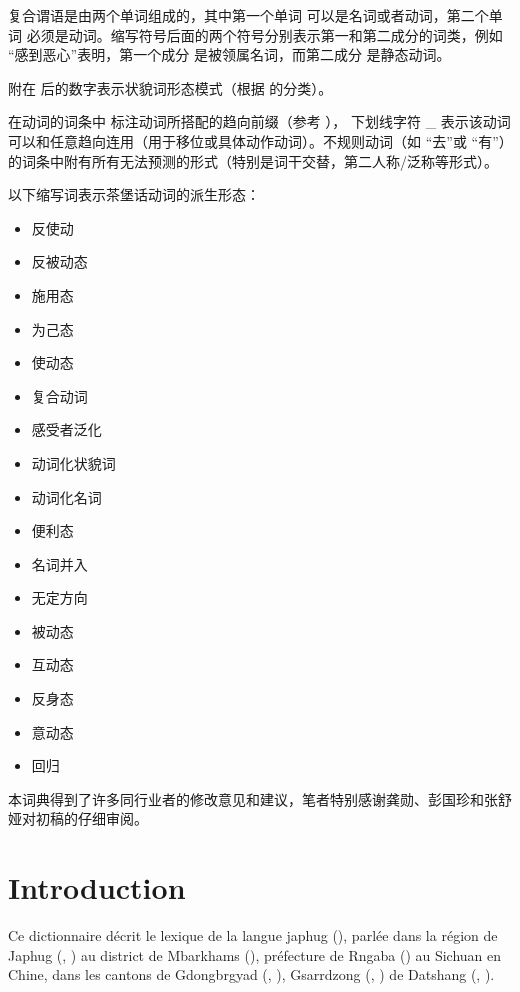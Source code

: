 复合谓语是由两个单词组成的，其中第一个单词  可以是名词或者动词，第二个单词 必须是动词。缩写符号后面的两个符号分别表示第一和第二成分的词类，例如   “感到恶心”表明，第一个成分  是被领属名词，而第二成分 是静态动词。

附在  后的数字表示状貌词形态模式（根据 \citealt{japhug14ideophones}的分类）。

在动词的词条中  标注动词所搭配的趋向前缀（参考 \citealt[267-9]{jacques14linking}）， 下划线字符 \_ 表示该动词可以和任意趋向连用（用于移位或具体动作动词）。不规则动词（如  “去”或    “有”）的词条中附有所有无法预测的形式（特别是词干交替，第二人称/泛称等形式）。

 以下缩写词表示茶堡话动词的派生形态：

\begin{itemize}
\item {} 反使动 
\item {} 反被动态
\item {} 施用态
\item {} 为己态
\item {} 使动态
\item {} 复合动词
\item {} 感受者泛化
\item {} 动词化状貌词
\item {} 动词化名词
\item {} 便利态
\item {} 名词并入
\item {} 无定方向
\item {} 被动态
\item {} 互动态
\item {} 反身态
\item {} 意动态
\item {} 回归
\end{itemize}

本词典得到了许多同行业者的修改意见和建议，笔者特别感谢龚勋、彭国珍和张舒娅对初稿的仔细审阅。
\newpage
\normalfont
\section*{Introduction}

Ce  dictionnaire décrit le lexique de la langue japhug (), parlée dans la région de Japhug (, ) au district de Mbarkhams (), préfecture de Rngaba () au Sichuan en Chine, dans les cantons de Gdongbrgyad (, ), Gsarrdzong (,   ) de Datshang (, ).  

